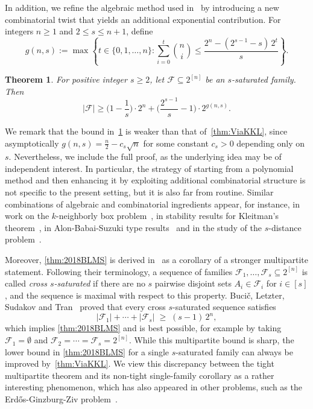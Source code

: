 \documentclass[11pt]{article}
\newtheorem{theorem}{Theorem}[section]
\theoremstyle{definition}
\begin{document}
In addition, we refine the algebraic method used in~\cite{2018BLMS} by introducing a new combinatorial twist that yields an additional exponential contribution. For integers \(n\ge 1\) and \(2\le s\le n+1\), define \[
g(n,s):=\max\left\{t\in\{0,1,\dots,n\}:
\sum_{i=0}^{t}\binom{n}{i}
\le
\frac{2^{n}-(2^{s-1}-s)\,2^{t}}{s}
\right\}.
\]
\begin{theorem}\label{thm:main}
    For positive integer \(s\ge 2\), let \(\mathcal{F}\subseteq 2^{[n]}\) be an \(s\)-saturated family. Then 
    \[|\mathcal{F}|\ge \bigg(1-\frac{1}{s}\bigg)\cdot 2^{n} + \bigg(\frac{2^{s-1}}{s}-1\bigg)\cdot 2^{g(n,s)}. \]
\end{theorem}
We remark that the bound in~\cref{thm:main} is weaker than that of~\cref{thm:ViaKKL}, since asymptotically \(g(n,s)=\frac{n}{2}-c_s\sqrt{n}\) for some constant \(c_s>0\) depending only on \(s\). Nevertheless, we include the full proof, as the underlying idea may be of independent interest. In particular, the strategy of starting from a polynomial method and then enhancing it by exploiting additional combinatorial structure is not specific to the present setting, but it is also far from routine. Similar combinations of algebraic and combinatorial ingredients appear, for instance, in work on the \(k\)-neighborly box problem~\cite{1997NogaAlon,2013DM,2012HuangSudakov}, in stability results for Kleitman's theorem~\cite{2023GaoLiuXu}, in Alon-Babai-Suzuki type results~\cite{2026AiLiuABS,1991JCTAABS,2015EUJCYounjin,2018WangWeiGe} and in the study of the \(s\)-distance problem~\cite{1981Distance1,1983Distance2,2021PAMSdistance}.


Moreover, \cref{thm:2018BLMS} is derived in~\cite{2018BLMS} as a corollary of a stronger multipartite statement. Following their terminology, a sequence of families \(\mathcal{F}_1,\ldots,\mathcal{F}_s \subseteq 2^{[n]}\) is called \emph{cross \(s\)-saturated} if there are no \(s\) pairwise disjoint sets \(A_i \in \mathcal{F}_i\) for \(i\in[s]\), and the sequence is maximal with respect to this property. Buci\v{c}, Letzter, Sudakov and Tran~\cite[Theorem~5]{2018BLMS} proved that every cross \(s\)-saturated sequence satisfies
\[
|\mathcal{F}_1|+\cdots+|\mathcal{F}_s| \;\ge\; (s-1)\,2^n,
\]
which implies \cref{thm:2018BLMS} and is best possible, for example by taking \(\mathcal{F}_1=\emptyset\) and \(\mathcal{F}_2=\cdots=\mathcal{F}_s=2^{[n]}\). While this multipartite bound is sharp, the lower bound in \cref{thm:2018BLMS} for a single \(s\)-saturated family can always be improved by~\cref{thm:ViaKKL}. We view this discrepancy between the tight multipartite theorem and its non-tight single-family corollary as a rather interesting phenomenon, which has also appeared in other problems, such as the Erd\H{o}s-Ginzburg-Ziv problem~\cite{2021IsrLisa,sauermann2023erdhosginzburgzivproblemlargedimension}.
\end{document}

